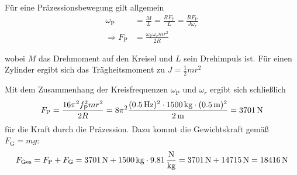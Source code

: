 \documentclass[a4paper]{scrartcl}
\begin{document}
Für eine Präzessionsbewegung gilt allgemein
\begin{align*}
  \omega_\text{P} & = \frac{M}{L} = \frac{RF_\text{P}}{L} = \frac{RF_\text{P}}{J\omega_r}\\
  \Rightarrow F_\text{P} & = \frac{\omega_\text{P}\omega_r mr^2}{2R}
\end{align*}

wobei $M$ das Drehmoment auf den Kreisel und $L$ sein Drehimpuls ist. Für einen Zylinder ergibt sich das Trägheitsmoment zu $J = \frac{1}{2}mr^2$

Mit dem Zusammenhang der Kreisfrequenzen $\omega_\text{P}$ und $\omega_r$ ergibt sich schließlich
\begin{equation*}
  F_\text{P} = \frac{16\pi^2f_\text{P}^2mr^2}{2R} = 8\pi^2 \frac{(\unit[0.5]{Hz})^2 \cdot \unit[1500]{kg} \cdot (\unit[0.5]{m})^2}{\unit[2]{m}} = \unit[3701]{N}
\end{equation*}
für die Kraft durch die Präzession. Dazu kommt die Gewichtskraft gemäß $F_\text{G} = mg$:
\begin{equation*}
  F_\text{Ges} = F_\text{P} + F_\text{G} = \unit[3701]{N} + \unit[1500]{kg} \cdot \unit[9.81]{\frac{N}{kg}} = \unit[3701]{N} + \unit[14715]{N} = \unit[18416]{N}
\end{equation*}
\end{document}
